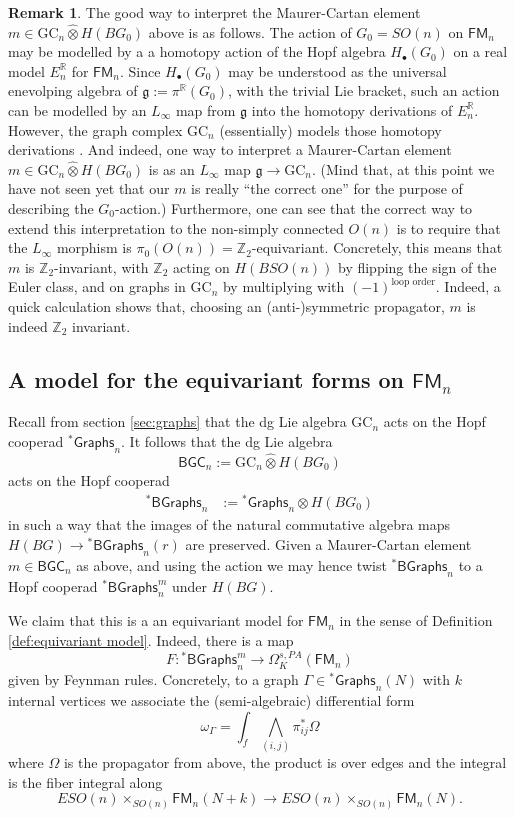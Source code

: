 \documentclass[a4paper]{amsart}
\theoremstyle{plain}
\theoremstyle{definition}
\newtheorem{rem}[thm]{Remark}
\newcommand{\alg}[1]{\mathfrak{{#1}}}
\newcommand{\R}{{\mathbb{R}}}
\newcommand{\Z}{{\mathbb{Z}}}
\newcommand{\Graphs}{{\mathsf{Graphs}}}
\newcommand{\FM}{\mathsf{FM}}
\newcommand{\GC}{\mathrm{GC}}
\newcommand{\BGC}{\mathsf{BGC}}
\newcommand{\BstG}{{}^*\mathsf{BGraphs}}
\newcommand{\stG}{{}^*\Graphs}
\newcommand{\SO}{\mathit{SO}}
\begin{document}
\begin{rem}
 The good way to interpret the Maurer-Cartan element $m\in\GC_n\hat \otimes H(BG_0)$ above is as follows.
The action of $G_0=\SO(n)$ on $\FM_n$ may be modelled by a a homotopy action of the Hopf algebra $H_\bullet(G_0)$ on a real model $E_n^\R$ for $\FM_n$.
Since $H_\bullet(G_0)$ may be understood as the universal enevolping algebra of $\alg g:= \pi^\R(G_0)$, with the trivial Lie bracket, such an action can be modelled by an $L_\infty$ map from $\alg g$ into the homotopy derivations of $E_n^\R$. However, the graph complex $\GC_n$ (essentially) models those homotopy derivations \cite{FTW}.
And indeed, one way to interpret a Maurer-Cartan element $m\in\GC_n\hat \otimes H(BG_0)$ is as an $L_\infty$ map $\alg g\to \GC_n$. (Mind that, at this point we have not seen yet that our $m$ is really ``the correct one'' for the purpose of describing the $G_0$-action.)
Furthermore, one can see that the correct way to extend this interpretation to the non-simply connected $O(n)$ is to require that the $L_\infty$ morphism is $\pi_0(O(n))=\Z_2$-equivariant. Concretely, this means that $m$ is $\Z_2$-invariant, with $\Z_2$ acting on $H(B\SO(n))$ by flipping the sign of the Euler class, and on graphs in $\GC_n$ by multiplying with $(-1)^{\text{loop order}}$. Indeed, a quick calculation shows that, choosing an (anti-)symmetric propagator, $m$ is indeed $\Z_2$ invariant.
\end{rem}




% 




\subsection{A model for the equivariant forms on \texorpdfstring{$\FM_n$}{FMn}}
Recall from section \ref{sec:graphs} that the dg Lie algebra $\GC_n$ acts on the Hopf cooperad $\stG_n$. It follows that the dg Lie algebra 
\[
\BGC_n := \GC_n\hat \otimes H(BG_0)
\]
acts on the Hopf cooperad
\begin{align*}
\BstG_n &:= \stG_n \otimes H(BG_0) %
\end{align*}
in such a way that the images of the natural commutative algebra maps $H(BG)\to \BstG_n(r)$ are preserved.
Given a Maurer-Cartan element $m\in \BGC_n$ as above, and using the action we may hence twist $\BstG_n$ to a Hopf cooperad $\BstG_n^m$ under $H(BG)$.

We claim that this is a an equivariant model for $\FM_n$ in the sense of Definition \ref{def:equivariant model}.
Indeed, there is a map
\[
 F: \BstG_n^m \to \Omega_{K}^{s,PA}(\FM_n)
\]
given by Feynman rules. Concretely, to a graph $\Gamma\in \stG_n(N)$ with $k$ internal vertices we associate the (semi-algebraic) differential form
\begin{equation}\label{equ:Kintegralequiv}
 \omega_\Gamma = \int_f \bigwedge_{(i,j)} \pi_{ij}^* \Omega
\end{equation}
where $\Omega$ is the propagator from above, the product is over edges and the integral is the fiber integral along
\[
 E\SO(n)\times_{\SO(n)} \FM_n(N+k) \to E\SO(n)\times_{\SO(n)} \FM_n(N).
\]
\end{document}
